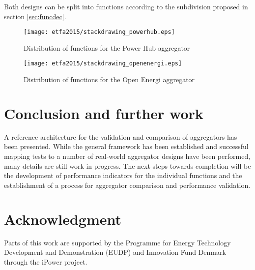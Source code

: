 Both designs can be split into functions according to the subdivision proposed in section \ref{sec:funcdec}.

\begin{figure}[htb]
\centering
\texttt{[image: etfa2015/stackdrawing\_powerhub.eps]}
\caption{Distribution of functions for the Power Hub aggregator}
\label{fig:powerhub}
\vspace*{-5mm}
\end{figure}
\begin{figure}[htb]
\centering
\texttt{[image: etfa2015/stackdrawing\_openenergi.eps]}
\caption{Distribution of functions for the Open Energi aggregator}
\label{fig:openenergi}
\vspace*{-5mm}
\end{figure}



\section{Conclusion and further work}
\label{sec:etfa2015:conclusion}
A reference architecture for the validation and comparison of aggregators has been presented. While the general framework has been established and successful mapping tests to a number of real-world aggregator designs have been performed, many details are still work in progress.
The next steps towards completion will be the development of performance indicators for the individual functions and the establishment of a process for aggregator comparison and performance validation.


%
%


\section*{Acknowledgment}
Parts of this work are supported by the Programme for Energy Technology Development and Demonstration (EUDP) and Innovation Fund Denmark through the iPower project.

